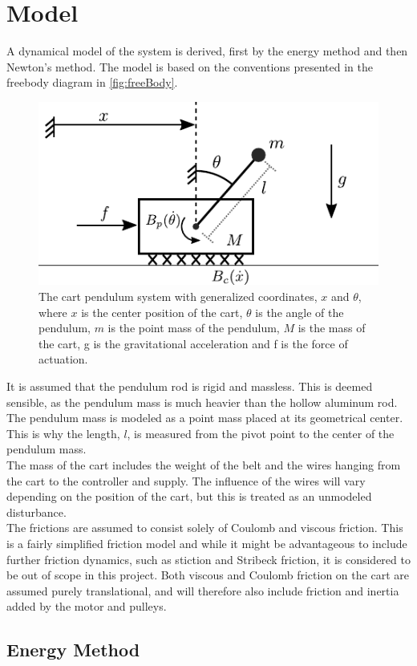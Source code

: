 \section{Model}
A dynamical model of the system is derived, first by the energy method and then Newton's method. The model is based on the conventions presented in the freebody diagram in \autoref{fig:freeBody}.

\begin{figure}[H]
  \includegraphics[width=.5\textwidth]{figures/freeBody}
  \caption{The cart pendulum system with generalized coordinates, $x$ and $\theta$, where $x$ is the center position of the cart, $\theta$ is the angle of the pendulum, $m$ is the point mass of the pendulum, $M$ is the mass of the cart, g is the gravitational acceleration and f is the force of actuation.}
  \label{fig:freeBody}
\end{figure}

It is assumed that the pendulum rod is rigid and massless. This is deemed sensible, as the pendulum mass is much heavier than the hollow aluminum rod. The pendulum mass is modeled as a point mass placed at its geometrical center. This is why the length, $l$, is measured from the pivot point to the center of the pendulum mass.\\
The mass of the cart includes the weight of the belt and the wires hanging from the cart to the controller and supply. The influence of the wires will vary depending on the position of the cart, but this is treated as an unmodeled disturbance.\\
The frictions are assumed to consist solely of Coulomb and viscous friction. This is a fairly simplified friction model and while it might be advantageous to include further friction dynamics, such as stiction and Stribeck friction, it is considered to be out of scope in this project. Both viscous and Coulomb friction on the cart are assumed purely translational, and will therefore also include friction and inertia added by the motor and pulleys.


\subsection{Energy Method}

